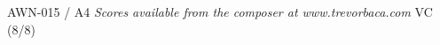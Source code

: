 \documentclass[11pt]{report}
\begin{document}
\null \vfill

AWN-015 / A4 \hfill
\textit{Scores available from the composer at www.trevorbaca.com}
\hfill VC (8/8)
\end{document}
